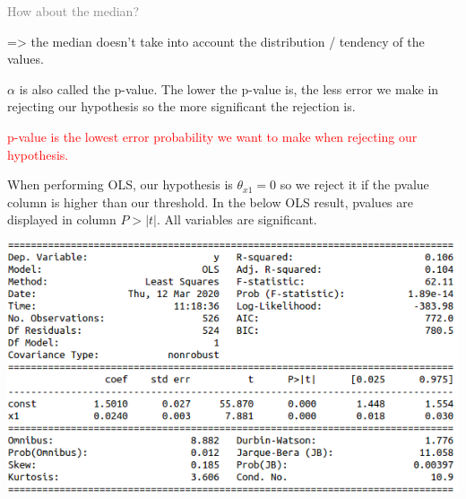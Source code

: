 \textcolor{gray}{How about the median?}

=> the median doesn't take into account the distribution / tendency of the values.

\vspace{5mm}

$\alpha$ is also called the p-value. The lower the p-value is, the less error we make in rejecting our hypothesis so the more significant the rejection is.

\textcolor{red}{p-value is the lowest error probability we want to make when rejecting our hypothesis.}

\vspace{5mm}

When performing OLS, our hypothesis is $\theta_{x1}=0$ so we reject it if the pvalue column is higher than our threshold. In the below OLS result, pvalues are displayed in column $P>|t|$. All variables are significant.

\begin{center}
\includegraphics[scale=0.5]{OLS_pvalue.png}
\end{center}

\vspace{5mm}